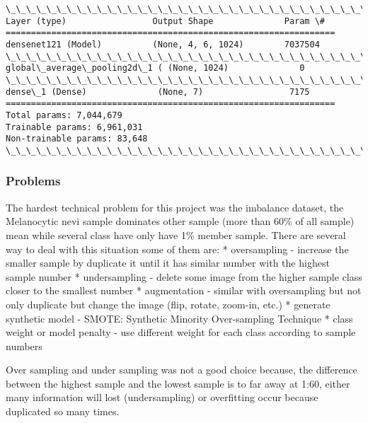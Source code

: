\documentclass[11pt]{article}
\begin{document}
    \begin{Verbatim}[commandchars=\\\{\}]
\_\_\_\_\_\_\_\_\_\_\_\_\_\_\_\_\_\_\_\_\_\_\_\_\_\_\_\_\_\_\_\_\_\_\_\_\_\_\_\_\_\_\_\_\_\_\_\_\_\_\_\_\_\_\_\_\_\_\_\_\_\_\_\_\_
Layer (type)                 Output Shape              Param \#   
=================================================================
densenet121 (Model)          (None, 4, 6, 1024)        7037504   
\_\_\_\_\_\_\_\_\_\_\_\_\_\_\_\_\_\_\_\_\_\_\_\_\_\_\_\_\_\_\_\_\_\_\_\_\_\_\_\_\_\_\_\_\_\_\_\_\_\_\_\_\_\_\_\_\_\_\_\_\_\_\_\_\_
global\_average\_pooling2d\_1 ( (None, 1024)              0         
\_\_\_\_\_\_\_\_\_\_\_\_\_\_\_\_\_\_\_\_\_\_\_\_\_\_\_\_\_\_\_\_\_\_\_\_\_\_\_\_\_\_\_\_\_\_\_\_\_\_\_\_\_\_\_\_\_\_\_\_\_\_\_\_\_
dense\_1 (Dense)              (None, 7)                 7175      
=================================================================
Total params: 7,044,679
Trainable params: 6,961,031
Non-trainable params: 83,648
\_\_\_\_\_\_\_\_\_\_\_\_\_\_\_\_\_\_\_\_\_\_\_\_\_\_\_\_\_\_\_\_\_\_\_\_\_\_\_\_\_\_\_\_\_\_\_\_\_\_\_\_\_\_\_\_\_\_\_\_\_\_\_\_\_

    \end{Verbatim}

    \subsubsection{Problems}\label{problems}

The hardest technical problem for this project was the imbalance
dataset, the Melanocytic nevi sample dominates other sample (more than
60\% of all sample) mean while several class have only have 1\% member
sample. There are several way to deal with this situation some of them
are: * oversampling - increase the smaller sample by duplicate it until
it has similar number with the highest sample number * undersampling -
delete some image from the higher sample class closer to the smallest
number * augmentation - similar with oversampling but not only duplicate
but change the image (flip, rotate, zoom-in, etc.) * generate synthetic
model - SMOTE: Synthetic Minority Over-sampling Technique * class weight
or model penalty - use different weight for each class according to
sample numbers

Over sampling and under sampling was not a good choice because, the
difference between the highest sample and the lowest sample is to far
away at 1:60, either many information will lost (undersampling) or
overfitting occur because duplicated so many times.
\end{document}
